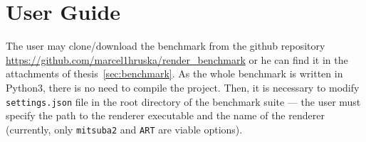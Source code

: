 \documentclass[12pt,a4paper]{report}
\begin{document}



\tableofcontents













\appendix
\chapter{User Guide}

The user may clone/download the benchmark from the github repository \url{https://github.com/marcel1hruska/render_benchmark} or he can find it in the attachments of thesis~\ref{sec:benchmark}. As the whole benchmark is written in Python3, there is no need to compile the project. Then, it is necessary to modify \texttt{settings.json} file in the root directory of the benchmark suite --- the user must specify the path to the renderer executable and the name of the renderer (currently, only \texttt{mitsuba2} and \texttt{ART} are viable options).
\end{document}
